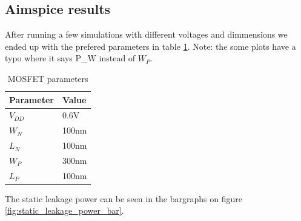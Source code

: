 \subsection{Aimspice results}

After running a few simulations with different voltages and dimmensions we ended up with the prefered parameters in table \ref{tab:MOSFET_parameters}. Note: the some plots have a typo where it says P\_W instead of $W_P$.

\begin{table}[H]
    \centering
    \caption{MOSFET parameters}
    \label{tab:MOSFET_parameters}
    \begin{tabular}{ll}
    \hline
    Parameter & Value \\ \hline
        $V_{DD}$& 0.6V  \\
        $W_N$ & 100nm \\
        $L_N$ & 100nm \\
        $W_P$ & 300nm \\
        $L_P$ & 100nm     
    \end{tabular}
\end{table}

The static leakage power can be seen in the bargraphs on figure \ref{fig:static_leakage_power_bar}.

